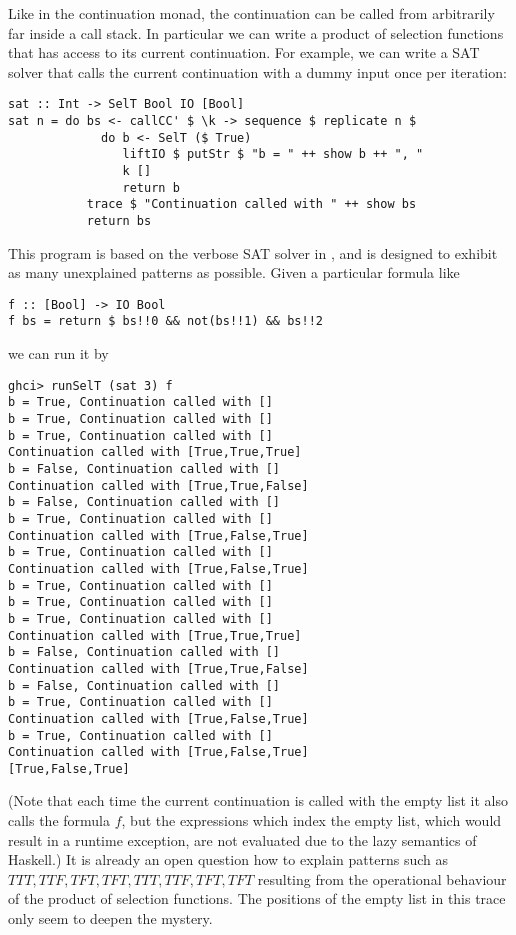 \documentclass{article}
\begin{document}
Like in the continuation monad, the continuation can be called from arbitrarily far inside a call stack. In particular we can write a product of selection functions that has access to its current continuation. For example, we can write a SAT solver that calls the current continuation with a dummy input once per iteration:
\begin{verbatim}
sat :: Int -> SelT Bool IO [Bool]
sat n = do bs <- callCC' $ \k -> sequence $ replicate n $
             do b <- SelT ($ True)
                liftIO $ putStr $ "b = " ++ show b ++ ", "
                k []
                return b
           trace $ "Continuation called with " ++ show bs
           return bs
\end{verbatim}
This program is based on the verbose SAT solver in \citep{hedges14}, and is designed to exhibit as many unexplained patterns as possible. Given a particular formula like
\begin{verbatim}
f :: [Bool] -> IO Bool
f bs = return $ bs!!0 && not(bs!!1) && bs!!2
\end{verbatim}
we can run it by
\begin{verbatim}
ghci> runSelT (sat 3) f
b = True, Continuation called with []
b = True, Continuation called with []
b = True, Continuation called with []
Continuation called with [True,True,True]
b = False, Continuation called with []
Continuation called with [True,True,False]
b = False, Continuation called with []
b = True, Continuation called with []
Continuation called with [True,False,True]
b = True, Continuation called with []
Continuation called with [True,False,True]
b = True, Continuation called with []
b = True, Continuation called with []
b = True, Continuation called with []
Continuation called with [True,True,True]
b = False, Continuation called with []
Continuation called with [True,True,False]
b = False, Continuation called with []
b = True, Continuation called with []
Continuation called with [True,False,True]
b = True, Continuation called with []
Continuation called with [True,False,True]
[True,False,True]
\end{verbatim}
(Note that each time the current continuation is called with the empty list it also calls the formula $f$, but the expressions which index the empty list, which would result in a runtime exception, are not evaluated due to the lazy semantics of Haskell.) It is already an open question how to explain patterns such as $TTT, TTF, TFT, TFT, TTT, TTF, TFT, TFT$ resulting from the operational behaviour of the product of selection functions. The positions of the empty list in this trace only seem to deepen the mystery.
\end{document}
